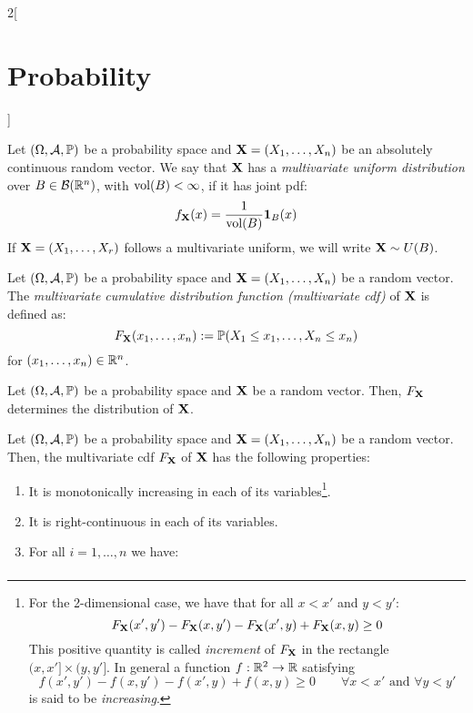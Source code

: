 \documentclass[../../../main.tex]{subfiles}
\begin{document}
\begin{multicols}{2}[\section{Probability}]
  \begin{definition}
    Let $(\Omega,\mathcal{A},\mathbb{P})$ be a probability space and $\boldsymbol{\mathrm{X}}=(X_1,\ldots,X_n)$ be an absolutely continuous random vector. We say that $\boldsymbol{\mathrm{X}}$ has a \textit{multivariate uniform distribution} over $B\in\mathcal{B}(\mathbb{R}^n)$, with $\operatorname{vol}(B)<\infty$, if it has joint pdf: $$f_{\boldsymbol{\mathrm{X}}}(x)=\frac{1}{\operatorname{vol}(B)}\boldsymbol{\mathrm{1}}_B(x)$$ If $\boldsymbol{\mathrm{X}}=(X_1,\ldots,X_r)$ follows a multivariate uniform, we will write $\boldsymbol{\mathrm{X}}\sim U(B)$.
  \end{definition}
  \begin{definition}
    Let $(\Omega,\mathcal{A},\mathbb{P})$ be a probability space and $\boldsymbol{\mathrm{X}}=(X_1,\ldots,X_n)$ be a random vector. The \textit{multivariate cumulative distribution function (multivariate cdf)} of $\boldsymbol{\mathrm{X}}$ is defined as: $$F_{\boldsymbol{\mathrm{X}}}(x_1,\ldots,x_n):=\mathbb{P}(X_1\leq x_1,\ldots,X_n\leq x_n)$$ for $(x_1,\ldots,x_n)\in\mathbb{R}^n$.
  \end{definition}
  \begin{theorem}
    Let $(\Omega,\mathcal{A},\mathbb{P})$ be a probability space and $\boldsymbol{\mathrm{X}}$ be a random vector. Then, $F_{\boldsymbol{\mathrm{X}}}$ determines the distribution of $\boldsymbol{\mathrm{X}}$.
  \end{theorem}
  \begin{prop}
    Let $(\Omega,\mathcal{A},\mathbb{P})$ be a probability space and $\boldsymbol{\mathrm{X}}=(X_1,\ldots,X_n)$ be a random vector. Then, the multivariate cdf $F_{\boldsymbol{\mathrm{X}}}$ of $\boldsymbol{\mathrm{X}}$ has the following properties:
    \begin{enumerate}
      \item It is monotonically increasing in each of its variables\footnote{For the 2-dimensional case, we have that for all $x<x'$ and $y<y'$: $$F_{\boldsymbol{\mathrm{X}}}(x',y')-F_{\boldsymbol{\mathrm{X}}}(x,y')-F_{\boldsymbol{\mathrm{X}}}(x',y)+F_{\boldsymbol{\mathrm{X}}}(x,y)\geq 0$$ This positive quantity is called \textit{increment} of $F_{\boldsymbol{\mathrm{X}}}$ in the rectangle $(x,x']\times(y,y']$. In general a function $f:\mathbb{R}^2\rightarrow\mathbb{R}$ satisfying $$f(x',y')-f(x,y')-f(x',y)+f(x,y)\geq 0\qquad\forall x<x'\text{ and }\forall y<y'$$ is said to be \textit{increasing}.}.
      \item It is right-continuous in each of its variables.
      \item For all $i=1,\ldots,n$ we have:
            \begin{gather*}

\end{gather*}
\end{enumerate}
\end{prop}
\end{multicols}
\end{document}
